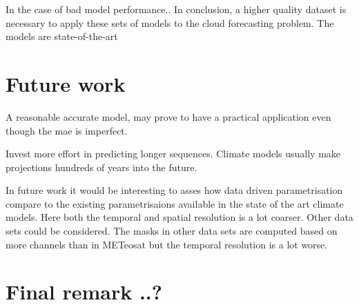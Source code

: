 In the case of bad model performance.. In conclusion, a higher quality dataset is necessary to apply these sets of models to the cloud forecasting problem. The models are state-of-the-art 


\section{Future work}
A reasonable accurate model, may prove to have a practical application even though the \acrshort{mae} is imperfect. 


Invest more effort in predicting longer sequences. Climate models usually make projections hundreds of years into the future.

In future work it would be interesting to asses how data driven parametrisation compare to the existing parametrisaions available in the state of the art climate models. Here both the temporal and spatial resolution is a lot coarser. Other data sets could be considered. The masks in other data sets are computed based on more channels than in METeosat but the temporal resolution is a lot worse. 



\section{Final remark ..? }
